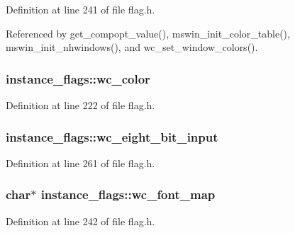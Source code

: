 Definition at line 241 of file flag.\+h.



Referenced by get\+\_\+compopt\+\_\+value(), mswin\+\_\+init\+\_\+color\+\_\+table(), mswin\+\_\+init\+\_\+nhwindows(), and wc\+\_\+set\+\_\+window\+\_\+colors().

\hypertarget{structinstance__flags_aeb4f11f17b68d914e35930a9bdbe7415}{
\subsubsection[{wc\+\_\+color}]{ instance\+\_\+flags\+::wc\+\_\+color}}\label{structinstance__flags_aeb4f11f17b68d914e35930a9bdbe7415}


Definition at line 222 of file flag.\+h.

\hypertarget{structinstance__flags_a80d99b815577eef2cb9c7e325f188daa}{
\subsubsection[{wc\+\_\+eight\+\_\+bit\+\_\+input}]{ instance\+\_\+flags\+::wc\+\_\+eight\+\_\+bit\+\_\+input}}\label{structinstance__flags_a80d99b815577eef2cb9c7e325f188daa}


Definition at line 261 of file flag.\+h.

\hypertarget{structinstance__flags_aa6ea2de4586a805d461b0a92a229b7a8}{
\subsubsection[{wc\+\_\+font\+\_\+map}]{\setlength{\rightskip}{0pt plus 5cm}char$\ast$ instance\+\_\+flags\+::wc\+\_\+font\+\_\+map}}\label{structinstance__flags_aa6ea2de4586a805d461b0a92a229b7a8}


Definition at line 242 of file flag.\+h.



